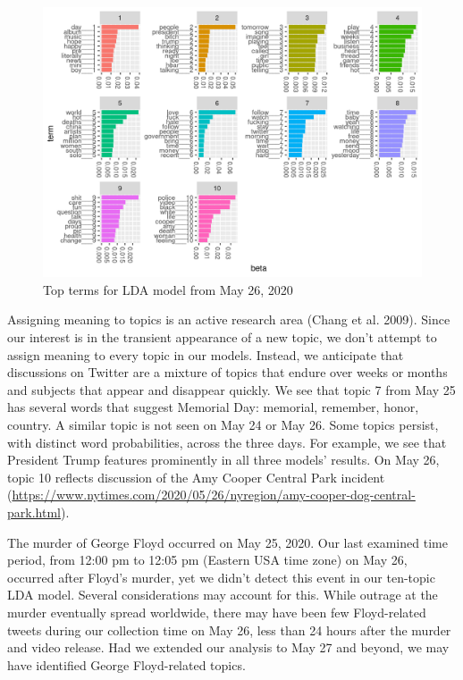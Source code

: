 \documentclass[
]{article}
\begin{document}
\begin{figure}
\includegraphics[width=29.17in]{../results/beta-2020-05-26} \caption{Top terms for LDA model from May 26, 2020}\label{fig:may26}
\end{figure}

Assigning meaning to topics is an active research area (Chang et al. 2009). Since
our interest is in the transient appearance of a new topic, we don't attempt to
assign meaning to every topic in our models. Instead, we anticipate that discussions on Twitter are a mixture of topics that endure over weeks or months and subjects that appear and disappear quickly. We see that topic 7 from May 25 has several
words that suggest Memorial Day: memorial, remember, honor, country. A similar topic is not
seen on May 24 or May 26. Some topics persist, with distinct word probabilities,
across the three days. For example, we see that President Trump features prominently in all
three models' results. On May 26, topic 10 reflects discussion of the Amy
Cooper Central Park incident (\url{https://www.nytimes.com/2020/05/26/nyregion/amy-cooper-dog-central-park.html}).

The murder of George Floyd occurred on May 25, 2020. Our last
examined time period, from 12:00 pm to 12:05 pm (Eastern USA time zone) on May 26, occurred after Floyd's murder,
yet we didn't detect this event in our ten-topic LDA model. Several considerations
may account for this. While outrage at the murder eventually spread worldwide, there may have been few
Floyd-related tweets during our collection time on May 26, less than 24 hours after the murder and video release.
Had we extended our analysis to May 27 and beyond, we may have identified George Floyd-related topics.
\end{document}
